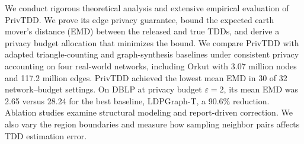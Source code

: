 
We conduct rigorous theoretical analysis and extensive empirical evaluation of PrivTDD.
We prove its edge privacy guarantee, bound the expected earth mover's distance (EMD) between the released and true TDDs, and derive a privacy budget allocation that minimizes the bound.
We compare PrivTDD with adapted triangle-counting and graph-synthesis baselines under consistent privacy accounting on four real-world networks, including Orkut with 3.07 million nodes and 117.2 million edges.
PrivTDD achieved the lowest mean EMD in 30 of 32 network--budget settings.
On DBLP at privacy budget $\varepsilon=2$, its mean EMD was 2.65 versus 28.24 for the best baseline, LDPGraph-T, a 90.6\% reduction.
Ablation studies examine structural modeling and report-driven correction. We also vary the region boundaries and measure how sampling neighbor pairs affects TDD estimation error.


